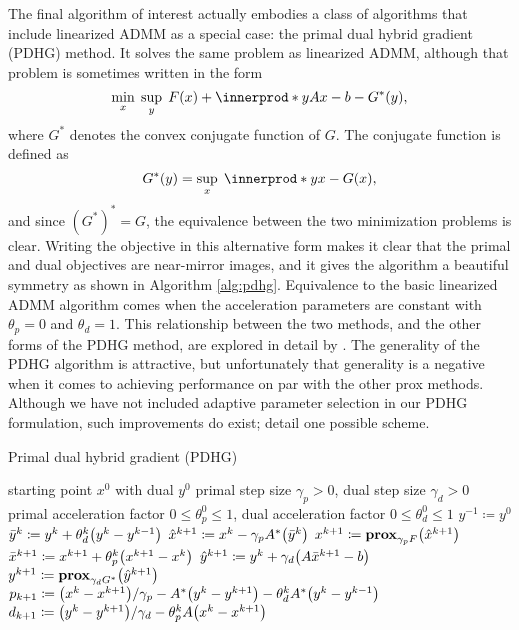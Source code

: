 The final algorithm of interest actually embodies a class of algorithms that include linearized ADMM as a special case: the primal dual hybrid gradient (PDHG) method. It solves the same problem as linearized ADMM, although that problem is sometimes written in the form
\begin{equation}
 \min_{x} \; \sup_{y} \; F(x) + \innerprod*{y}{Ax - b} - G^*(y),
\end{equation}
where $G^*$ denotes the convex conjugate function of $G$. The conjugate function is defined as
\begin{equation}
 G^*(y) = \sup_{x} \; \innerprod*{y}{x} - G(x),
\end{equation}
and since $(G^*)^* = G$, the equivalence between the two minimization problems is clear. Writing the objective in this alternative form makes it clear that the primal and dual objectives are near-mirror images, and it gives the algorithm a beautiful symmetry as shown in Algorithm \ref{alg:pdhg}. Equivalence to the basic linearized ADMM algorithm comes when the acceleration parameters are constant with $\theta_p = 0$ and $\theta_d = 1$. This relationship between the two methods, and the other forms of the PDHG method, are explored in detail by \textcite{EZC10}. The generality of the PDHG algorithm is attractive, but unfortunately that generality is a negative when it comes to achieving performance on par with the other prox methods. Although we have not included adaptive parameter selection in our PDHG formulation, such improvements do exist; \textcite{GEB13} detail one possible scheme.
\begin{algorithm}[tpb]
 \caption{Primal dual hybrid gradient (PDHG)}
 \label{alg:pdhg}
 \begin{algorithmic}
  \GIVEN starting point $x^0$ with dual $y^0$
  \GIVEN primal step size $\gamma_p > 0$, dual step size $\gamma_d > 0$
  \GIVEN primal acceleration factor $0 \le \theta_p^0 \le 1$, dual acceleration factor $0 \le \theta_d^0 \le 1$
  \STATE $y^{-1} \coloneqq y^0$
  \REPEAT
   \STATE $\bar{y}^k \coloneqq y^k + \theta_d^k \paren*{y^k - y^{k-1}}$
   \STATE $\hat{x}^{k+1} \coloneqq x^k - \gamma_p A^*\paren*{\bar{y}^k}$
   \STATE $x^{k+1} \coloneqq \prox_{\gamma_p F}\paren*{\hat{x}^{k+1}}$
   \STATE $\bar{x}^{k+1} \coloneqq x^{k+1} + \theta_p^k \paren*{x^{k+1} - x^k}$
   \STATE $\hat{y}^{k+1} \coloneqq y^k + \gamma_d \paren*{A\bar{x}^{k+1} - b}$
   \STATE $y^{k+1} \coloneqq \prox_{\gamma_d G^*}\paren*{\hat{y}^{k+1}}$
   \STATE $p_{k+1} \coloneqq \paren*{x^k - x^{k+1}}/\gamma_p - A^*\paren*{y^k - y^{k+1}} - \theta_d^k A^*\paren*{y^k - y^{k-1}}$
   \STATE $d_{k+1} \coloneqq \paren*{y^k - y^{k+1}}/\gamma_d - \theta_p^k A\paren*{x^k - x^{k+1}}$
 \end{algorithmic}
\end{algorithm}%

